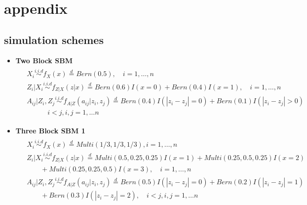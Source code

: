 \documentclass[12pt]{article}
\theoremstyle{definition}
\begin{document}
 	
\appendix
\section{appendix}
\label{sec:appendix}

\subsection{simulation schemes}

\begin{itemize}	
	\item \textbf{Two Block SBM}	
	\begin{equation}
	\begin{gathered}
	\begin{aligned}
	&	X_{i}  \overset{i.i.d}{\sim} f_{X}(x)  \stackrel{d}{=}  Bern(0.5), \quad   i = 1, \ldots , n \\ 
	&	Z_{i} | X_{i}   \overset{i.i.d}{\sim}    f_{Z|X}(z|x)  \stackrel{d}{=}  Bern(0.6) I( x = 0 ) +   Bern(0.4) I (x = 1), \quad  i = 1,\ldots,n  \\
	&	A_{ij} | Z_{i}, Z_{j}   \overset{i.i.d}{\sim}   f_{A|Z}(a_{ij} | z_{i}, z_{j}) \stackrel{d}{=}  Bern(0.4) I ( |z_{i} - z_{j}| = 0 )  + Bern(0.1) I(|z_{i} - z_{j}| > 0) \\ & \quad \quad \quad i < j, i,j=1, \ldots n 
	\end{aligned}
	\end{gathered}
	\label{eq:twoSBM}
	\end{equation} 
	
	\item \textbf{Three Block SBM 1}
	\begin{equation}
	\label{eq:Three}
	\begin{gathered}
	\begin{aligned}
	&  X_{i} \overset{i.i.d}{\sim} f_{X}(x)   \stackrel{d}{=}  Multi(1/3, 1/3, 1/3), i = 1, \ldots , n \\ 
	&  Z_{i} | X_{i}  \overset{i.i.d}{\sim}    f_{Z|X}(z|x)  \stackrel{d}{=}   Multi(0.5, 0.25, 0.25) I( x = 1 ) +   Multi(0.25, 0.5, 0.25) I (x = 2)  \qquad  \\ & \quad \quad + Multi(0.25, 0.25, 0.5)I(x = 3), \quad  i = 1,\ldots,n  \\
	&  A_{ij} | Z_{i}, Z_{j}   \overset{i.i.d}{\sim}   f_{A|Z}(a_{ij} | z_{i}, z_{j}) \stackrel{d}{=}  Bern(0.5) I ( |z_{i} - z_{j}| = 0 )  + Bern(0.2) I(|z_{i} - z_{j}| = 1) \\ & \quad \quad + Bern(0.3) I (|z_{i} - z_{j}| = 2),  \quad i < j, i,j=1, \ldots n 
	\end{aligned}
	\end{gathered}
	\end{equation}
	

\end{itemize}
\end{document}
